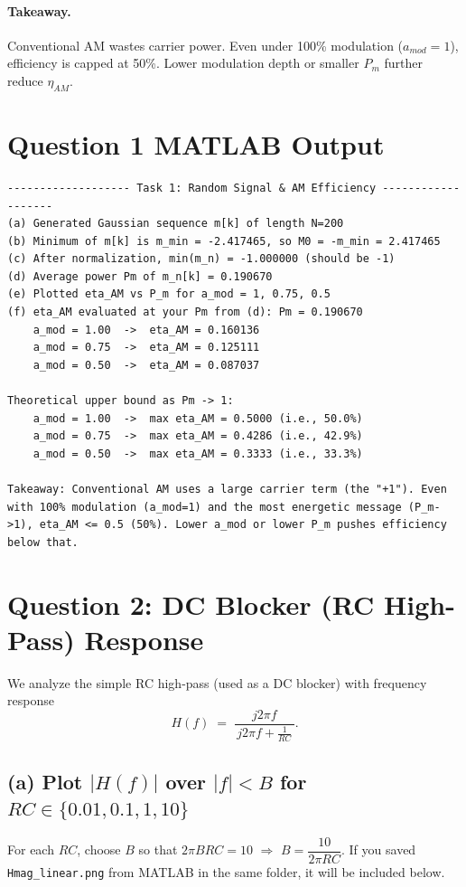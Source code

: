 \documentclass[11pt]{article}
\begin{document}
\paragraph{Takeaway.}
Conventional AM wastes carrier power. Even under 100\% modulation (\(a_{mod}=1\)), efficiency is capped at 50\%. Lower modulation depth or smaller \(P_m\) further reduce \(\eta_{AM}\).


\newpage
\section*{Question 1 MATLAB Output}

\begin{lstlisting}[style=mcode,caption={Task 1 MATLAB Command Window Output}]
------------------- Task 1: Random Signal & AM Efficiency -------------------
(a) Generated Gaussian sequence m[k] of length N=200
(b) Minimum of m[k] is m_min = -2.417465, so M0 = -m_min = 2.417465
(c) After normalization, min(m_n) = -1.000000 (should be -1)
(d) Average power Pm of m_n[k] = 0.190670
(e) Plotted eta_AM vs P_m for a_mod = 1, 0.75, 0.5
(f) eta_AM evaluated at your Pm from (d): Pm = 0.190670
    a_mod = 1.00  ->  eta_AM = 0.160136
    a_mod = 0.75  ->  eta_AM = 0.125111
    a_mod = 0.50  ->  eta_AM = 0.087037

Theoretical upper bound as Pm -> 1:
    a_mod = 1.00  ->  max eta_AM = 0.5000 (i.e., 50.0%)
    a_mod = 0.75  ->  max eta_AM = 0.4286 (i.e., 42.9%)
    a_mod = 0.50  ->  max eta_AM = 0.3333 (i.e., 33.3%)

Takeaway: Conventional AM uses a large carrier term (the "+1"). Even with 100% modulation (a_mod=1) and the most energetic message (P_m->1), eta_AM <= 0.5 (50%). Lower a_mod or lower P_m pushes efficiency below that.
\end{lstlisting}

\newpage

\section*{Question 2: DC Blocker (RC High-Pass) Response}

We analyze the simple RC high-pass (used as a DC blocker) with frequency response
\[
H(f) \;=\; \frac{j2\pi f}{\,j2\pi f + \frac{1}{RC}\,}.
\]

\subsection*{(a) Plot \(|H(f)|\) over \(|f|<B\) for \(RC \in \{0.01, 0.1, 1, 10\}\)}
For each \(RC\), choose \(B\) so that \(2\pi BRC = 10\) \(\Rightarrow\) \(B=\dfrac{10}{2\pi RC}\).
If you saved \texttt{Hmag\_linear.png} from MATLAB in the same folder, it will be included below.
\end{document}
